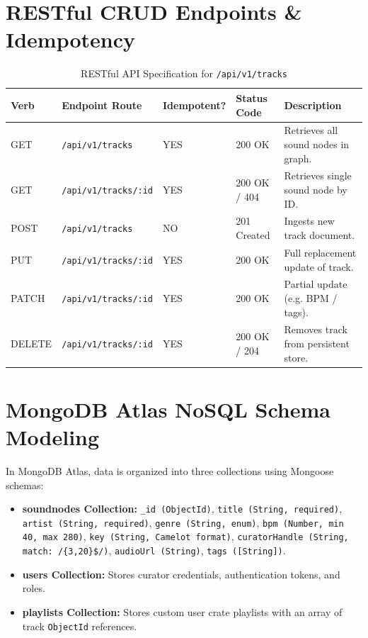 \documentclass[12pt,a4paper,oneside]{report}
\begin{document}
\section{RESTful CRUD Endpoints \& Idempotency}
\begin{table}[H]
\centering
\small
\caption{RESTful API Specification for \texttt{/api/v1/tracks}}
\label{tab:rest_crud}
\begin{tabularx}{\textwidth}{lllp{2.5cm}X}
\toprule
\textbf{Verb} & \textbf{Endpoint Route} & \textbf{Idempotent?} & \textbf{Status Code} & \textbf{Description} \\
\midrule
GET & \texttt{/api/v1/tracks} & YES & 200 OK & Retrieves all sound nodes in graph. \\
GET & \texttt{/api/v1/tracks/:id} & YES & 200 OK / 404 & Retrieves single sound node by ID. \\
POST & \texttt{/api/v1/tracks} & NO & 201 Created & Ingests new track document. \\
PUT & \texttt{/api/v1/tracks/:id} & YES & 200 OK & Full replacement update of track. \\
PATCH & \texttt{/api/v1/tracks/:id} & YES & 200 OK & Partial update (e.g. BPM / tags). \\
DELETE & \texttt{/api/v1/tracks/:id} & YES & 200 OK / 204 & Removes track from persistent store. \\
\bottomrule
\end{tabularx}
\end{table}

\section{MongoDB Atlas NoSQL Schema Modeling}
In MongoDB Atlas, data is organized into three collections using Mongoose schemas:
\begin{itemize}
    \item \textbf{soundnodes Collection:} \texttt{\_id (ObjectId)}, \texttt{title (String, required)}, \texttt{artist (String, required)}, \texttt{genre (String, enum)}, \texttt{bpm (Number, min 40, max 280)}, \texttt{key (String, Camelot format)}, \texttt{curatorHandle (String, match: /\textasciicircum@[a-zA-Z0-9\_]\{3,20\}\$/)}, \texttt{audioUrl (String)}, \texttt{tags ([String])}.
    \item \textbf{users Collection:} Stores curator credentials, authentication tokens, and roles.
    \item \textbf{playlists Collection:} Stores custom user crate playlists with an array of track \texttt{ObjectId} references.
\end{itemize}
\end{document}
